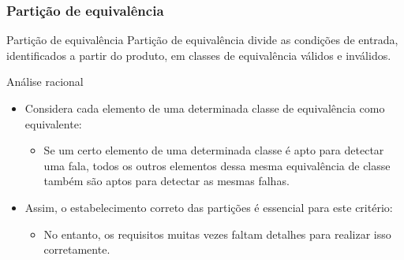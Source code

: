 \begin{frame}[ parent={concept:functional-testing}, hasprev=false, hasnext=true]
\frametitle{Partição de equivalência}
\label{concept:equivalence-partition}

\begin{block:concept}{Partição de equivalência}
Partição de equivalência divide as condições de entrada, identificados a partir do
produto, em classes de equivalência válidos e inválidos.
\end{block:concept}

\begin{block:fact}{Análise racional}
\begin{itemize}
	\item Considera cada elemento de uma determinada classe de equivalência como equivalente:
	\begin{itemize}
		\item Se um certo elemento de uma determinada classe é apto para
		detectar uma fala, todos os outros elementos dessa mesma equivalência de classe
		também são aptos para detectar as mesmas falhas.
	\end{itemize}

	\item Assim, o estabelecimento correto das partições é essencial para este critério:
	\begin{itemize}
		\item No entanto, os requisitos muitas vezes faltam detalhes para realizar isso corretamente.
	\end{itemize}
\end{itemize}
\end{block:fact}
\end{frame}



